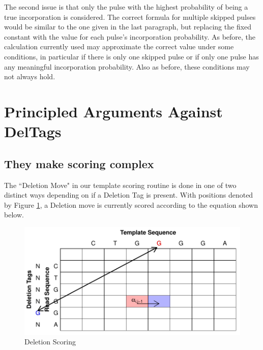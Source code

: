 \documentclass[fleqn,10pt]{SelfArx} %
\begin{document}
The second issue is that only the pulse with the highest probability of being a true incorporation is considered.  The correct formula for multiple skipped pulses would be similar to the one given in the last paragraph, but replacing the fixed constant with the value for each pulse's incorporation probability.  As before, the calculation currently used may approximate the correct value under some conditions, in particular if there is only one skipped pulse or if only one pulse has any meaningful incorporation probability.  Also as before, these conditions may not always hold. 


 




\section{Principled Arguments Against DelTags}



\subsection{They make scoring complex}

The ``Deletion Move" in our template scoring routine is done in one of two distinct ways depending on if a Deletion Tag is present.  With positions denoted by Figure \ref{fig:del}, a Deletion move is currently scored according to the equation shown below.  

\begin{figure}[ht]\centering %
\includegraphics[width=\linewidth]{Deletion}
\caption{Deletion Scoring}
\label{fig:del}
\end{figure}
\end{document}
